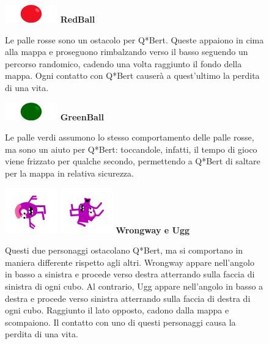 \documentclass[a4paper,12pt, hidelinks]{report}
\begin{document}
\begin{figure}[H]
		\item
		\includegraphics[width=0.15\linewidth]{img/RedBall}
		\label{img:RedBall}
		\textbf{RedBall}

		Le palle rosse sono un ostacolo per Q*Bert. Queste appaiono in cima alla mappa e proseguono rimbalzando verso il basso seguendo un percorso randomico, cadendo una volta raggiunto il fondo della mappa. Ogni contatto con Q*Bert causerà a quest'ultimo la perdita di una vita.

\end{figure}

\begin{figure}[H]
		\item
		\includegraphics[width=0.15\linewidth]{img/GreenBall}
		\label{img:GreenBall}
		\textbf{GreenBall}

		Le palle verdi assumono lo stesso comportamento delle palle rosse, ma sono un aiuto per Q*Bert: toccandole, infatti, il tempo di gioco viene frizzato per qualche secondo, permettendo a Q*Bert di saltare per la mappa in relativa sicurezza.

\end{figure}

\begin{figure}[H]
		\item
		\includegraphics[width=0.15\linewidth]{img/Wrongway}
		\includegraphics[width=0.15\linewidth]{img/Ugg}
		\label{img:Wrongway&Ugg}
		\textbf{Wrongway e Ugg}

		Questi due personaggi ostacolano Q*Bert, ma si comportano in maniera differente rispetto agli altri. Wrongway appare nell'angolo in basso a sinistra e procede verso destra atterrando sulla faccia di sinistra di ogni cubo. Al contrario, Ugg appare nell'angolo in basso a destra e procede verso sinistra atterrando sulla faccia di destra di ogni cubo. Raggiunto il lato opposto, cadono dalla mappa e scompaiono. Il contatto con uno di questi personaggi causa la perdita di una vita.

\end{figure}
\end{document}
